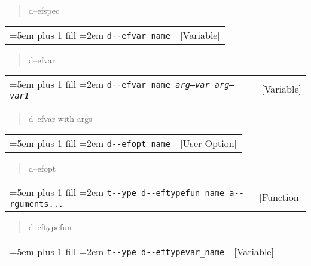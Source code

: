 \documentclass{book}
\begin{document}
%
\begin{quote}
\unskip{\parskip=0pt\noindent}%
d--efspec
\end{quote}


\noindent\begin{tabularx}{\linewidth}{@{}Xr}
\rightskip=5em plus 1 fill
\hangindent=2em
\texttt{d{-}{-}efvar\_name}& [Variable]
\end{tabularx}

%
\begin{quote}
\unskip{\parskip=0pt\noindent}%
d--efvar
\end{quote}


\noindent\begin{tabularx}{\linewidth}{@{}Xr}
\rightskip=5em plus 1 fill
\hangindent=2em
\texttt{d{-}{-}efvar\_name \EmbracOn{}\textnormal{\textsl{arg--var arg--var1}}\EmbracOff{}}& [Variable]
\end{tabularx}

%
\begin{quote}
\unskip{\parskip=0pt\noindent}%
d--efvar with args
\end{quote}


\noindent\begin{tabularx}{\linewidth}{@{}Xr}
\rightskip=5em plus 1 fill
\hangindent=2em
\texttt{d{-}{-}efopt\_name}& [User Option]
\end{tabularx}

%
\begin{quote}
\unskip{\parskip=0pt\noindent}%
d--efopt
\end{quote}


\noindent\begin{tabularx}{\linewidth}{@{}Xr}
\rightskip=5em plus 1 fill
\hangindent=2em
\texttt{t{-}{-}ype d{-}{-}eftypefun\_name a{-}{-}rguments...}& [Function]
\end{tabularx}

%
\begin{quote}
\unskip{\parskip=0pt\noindent}%
d--eftypefun
\end{quote}


\noindent\begin{tabularx}{\linewidth}{@{}Xr}
\rightskip=5em plus 1 fill
\hangindent=2em
\texttt{t{-}{-}ype d{-}{-}eftypevar\_name}& [Variable]
\end{tabularx}
\end{document}
